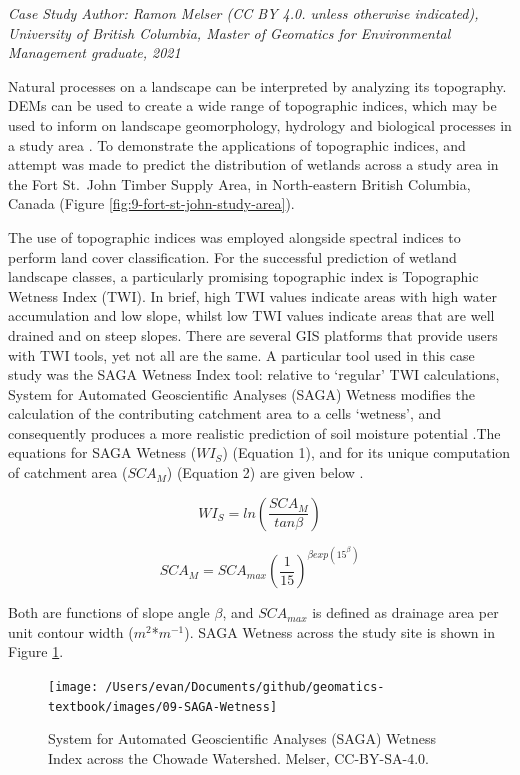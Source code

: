 \documentclass[
]{book}
\begin{document}
\emph{Case Study Author: Ramon Melser (CC BY 4.0. unless otherwise indicated), University of British Columbia, Master of Geomatics for Environmental Management graduate, 2021}

Natural processes on a landscape can be interpreted by analyzing its topography. DEMs can be used to create a wide range of topographic indices, which may be used to inform on landscape geomorphology, hydrology and biological processes in a study area \citep{mattivi2019twi}. To demonstrate the applications of topographic indices, and attempt was made to predict the distribution of wetlands across a study area in the Fort St.~John Timber Supply Area, in North-eastern British Columbia, Canada (Figure \ref{fig:9-fort-st-john-study-area}).

The use of topographic indices was employed alongside spectral indices to perform land cover classification. For the successful prediction of wetland landscape classes, a particularly promising topographic index is Topographic Wetness Index (TWI). In brief, high TWI values indicate areas with high water accumulation and low slope, whilst low TWI values indicate areas that are well drained and on steep slopes. There are several GIS platforms that provide users with TWI tools, yet not all are the same. A particular tool used in this case study was the SAGA Wetness Index tool: relative to `regular' TWI calculations, System for Automated Geoscientific Analyses (SAGA) Wetness modifies the calculation of the contributing catchment area to a cells `wetness', and consequently produces a more realistic prediction of soil moisture potential \citep{mattivi2019twi}.The equations for SAGA Wetness (\(WI_S\)) (Equation 1), and for its unique computation of catchment area (\(SCA_M\)) (Equation 2) are given below \citep{bohner2006spatial}.

\[
\tag{Equation 1} 
WI_S = ln (\frac{SCA_M}{tan\beta})
\]

\[
\tag{Equation 2}
SCA_M = SCA_{max} (\frac{1}{15})^{\beta exp(15^{\beta})}
\]

Both are functions of slope angle \(\beta\), and \(SCA_{max}\) is defined as drainage area per unit contour width (\(m^2\)*\(m^{-1}\)). SAGA Wetness across the study site is shown in Figure \ref{fig:9-SAGA-Wetness}.

\begin{figure}
\texttt{[image: /Users/evan/Documents/github/geomatics-textbook/images/09-SAGA-Wetness]} \caption{System for Automated Geoscientific Analyses (SAGA) Wetness Index across the Chowade Watershed. Melser, CC-BY-SA-4.0.}\label{fig:9-SAGA-Wetness}
\end{figure}
\end{document}
